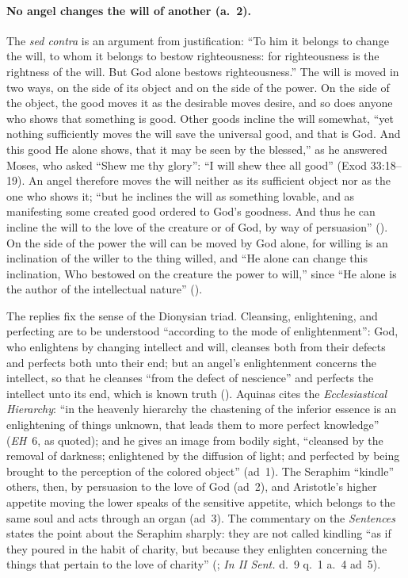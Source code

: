 \paragraph{No angel changes the will of another (a.~2).} The \emph{sed
contra} is an argument from justification: ``To him it belongs to change the
will, to whom it belongs to bestow righteousness: for righteousness is the
rightness of the will. But God alone bestows righteousness.'' The will is
moved in two ways, on the side of its object and on the side of the power.
On the side of the object, the good moves it as the desirable moves desire,
and so does anyone who shows that something is good. Other goods incline
the will somewhat, ``yet nothing sufficiently moves the will save the
universal good, and that is God. And this good He alone shows, that it may
be seen by the blessed,'' as he answered Moses, who asked ``Shew me thy
glory'': ``I will shew thee all good'' (Exod 33:18--19). An angel therefore
moves the will neither as its sufficient object nor as the one who shows it;
``but he inclines the will as something lovable, and as manifesting some
created good ordered to God's goodness. And thus he can incline the will to
the love of the creature or of God, by way of persuasion'' (). On the side of the power the will can be moved by God
alone, for willing is an inclination of the willer to the thing willed, and
``He alone can change this inclination, Who bestowed on the creature the
power to will,'' since ``He alone is the author of the intellectual nature''
().

The replies fix the sense of the Dionysian triad. Cleansing, enlightening,
and perfecting are to be understood ``according to the mode of
enlightenment'': God, who enlightens by changing intellect and will, cleanses
both from their defects and perfects both unto their end; but an angel's
enlightenment concerns the intellect, so that he cleanses ``from the defect
of nescience'' and perfects the intellect unto its end, which is known truth
(). Aquinas cites the \emph{Ecclesiastical
Hierarchy}: ``in the heavenly hierarchy the chastening of the inferior
essence is an enlightening of things unknown, that leads them to more
perfect knowledge'' (\emph{EH}~6, as quoted); and he gives an image from
bodily sight, ``cleansed by the removal of darkness; enlightened by the
diffusion of light; and perfected by being brought to the perception of the
colored object'' (ad~1). The Seraphim ``kindle'' others, then, by
persuasion to the love of God (ad~2), and Aristotle's higher appetite moving
the lower speaks of the sensitive appetite, which belongs to the same soul
and acts through an organ (ad~3). The commentary on the \emph{Sentences}
states the point about the Seraphim sharply: they are not called kindling
``as if they poured in the habit of charity, but because they enlighten
concerning the things that pertain to the love of charity'' (; \emph{In II
Sent.} d.~9 q.~1 a.~4 ad~5).

